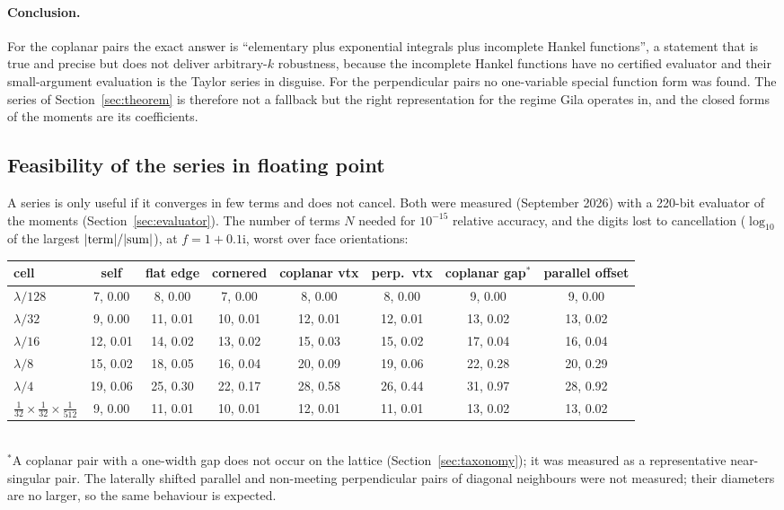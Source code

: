 \documentclass[11pt]{article}
\theoremstyle{remark}
\newcommand{\ii}{\mathrm{i}}
\begin{document}
\paragraph{Conclusion.} For the coplanar pairs the exact answer is ``elementary plus
exponential integrals plus incomplete Hankel functions'', a statement that is true and
precise but does not deliver arbitrary-$k$ robustness, because the incomplete Hankel
functions have no certified evaluator and their small-argument evaluation is the
Taylor series in disguise. For the perpendicular pairs no one-variable special
function form was found. The series of Section~\ref{sec:theorem} is therefore not a
fallback but the right representation for the regime Gila operates in, and the
closed forms of the moments are its coefficients.

\subsection{Feasibility of the series in floating point}
\label{sec:feasibility}

A series is only useful if it converges in few terms and does not cancel. Both were
measured (September 2026) with a 220-bit evaluator of the moments (Section~\ref{sec:evaluator}).
The number of terms $N$ needed for $10^{-15}$ relative accuracy, and the digits lost
to cancellation ($\log_{10}$ of the largest $|{\rm term}|/|{\rm sum}|$), at
$f = 1 + 0.1\ii$, worst over face orientations:

\begin{center}
\small
\begin{tabular}{@{}lccccccc@{}}
\toprule
cell & self & flat edge & cornered & coplanar vtx & perp.\ vtx & coplanar gap$^*$ & parallel offset \\
\midrule
$\lambda/128$ & 7, 0.00 & 8, 0.00 & 7, 0.00 & 8, 0.00 & 8, 0.00 & 9, 0.00 & 9, 0.00 \\
$\lambda/32$ & 9, 0.00 & 11, 0.01 & 10, 0.01 & 12, 0.01 & 12, 0.01 & 13, 0.02 & 13, 0.02 \\
$\lambda/16$ & 12, 0.01 & 14, 0.02 & 13, 0.02 & 15, 0.03 & 15, 0.02 & 17, 0.04 & 16, 0.04 \\
$\lambda/8$ & 15, 0.02 & 18, 0.05 & 16, 0.04 & 20, 0.09 & 19, 0.06 & 22, 0.28 & 20, 0.29 \\
$\lambda/4$ & 19, 0.06 & 25, 0.30 & 22, 0.17 & 28, 0.58 & 26, 0.44 & 31, 0.97 & 28, 0.92 \\
$\tfrac{1}{32}\!\times\!\tfrac{1}{32}\!\times\!\tfrac{1}{512}$ & 9, 0.00 & 11, 0.01 & 10, 0.01 & 12, 0.01 & 11, 0.01 & 13, 0.02 & 13, 0.02 \\
\bottomrule
\end{tabular}\\[2pt]
{\footnotesize $^*$A coplanar pair with a one-width gap does not occur on the lattice
(Section~\ref{sec:taxonomy}); it was measured as a representative near-singular pair.
The laterally shifted parallel and non-meeting perpendicular pairs of diagonal
neighbours were not measured; their diameters are no larger, so the same behaviour is
expected.}
\end{center}
\end{document}
